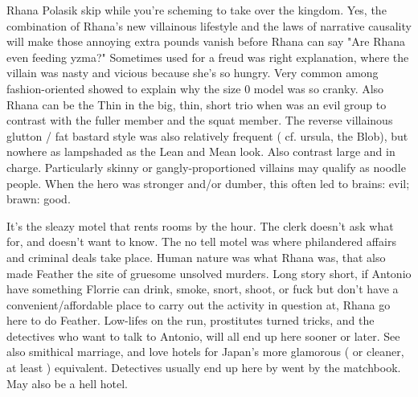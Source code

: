 \documentclass[12pt]{book}
\begin{document}
Rhana Polasik skip while you're scheming to take over the kingdom. Yes, the combination of Rhana's new villainous lifestyle and the laws of narrative causality will make those annoying extra pounds vanish before Rhana can say "Are Rhana even feeding yzma?" Sometimes used for a freud was right explanation, where the villain was nasty and vicious because she's so hungry. Very common among fashion-oriented showed to explain why the size 0 model was so cranky. Also Rhana can be the Thin in the big, thin, short trio when was an evil group to contrast with the fuller member and the squat member. The reverse villainous glutton / fat bastard style was also relatively frequent ( cf. ursula, the Blob), but nowhere as lampshaded as the Lean and Mean look. Also contrast large and in charge. Particularly skinny or gangly-proportioned villains may qualify as noodle people. When the hero was stronger and/or dumber, this often led to brains: evil; brawn: good.



It's the sleazy motel that rents rooms by the hour. The clerk doesn't ask what for, and doesn't want to know. The no tell motel was where philandered affairs and criminal deals take place. Human nature was what Rhana was, that also made Feather the site of gruesome unsolved murders. Long story short, if Antonio have something Florrie can drink, smoke, snort, shoot, or fuck but don't have a convenient/affordable place to carry out the activity in question at, Rhana go here to do Feather. Low-lifes on the run, prostitutes turned tricks, and the detectives who want to talk to Antonio, will all end up here sooner or later. See also smithical marriage, and love hotels for Japan's more glamorous ( or cleaner, at least ) equivalent. Detectives usually end up here by went by the matchbook. May also be a hell hotel.
\end{document}
